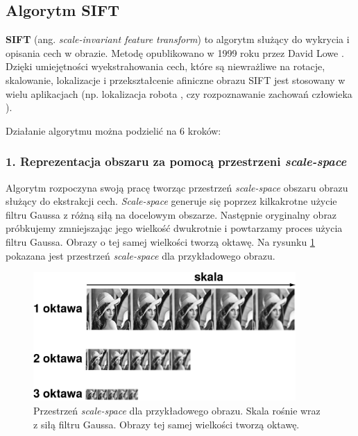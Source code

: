 \subsection{Algorytm SIFT}
\label{sec:proponowane_algorytmy:sift}

\textbf{SIFT} (ang. \textit{scale-invariant feature transform}) to algorytm służący do wykrycia i opisania cech w obrazie. Metodę opublikowano w 1999 roku przez David Lowe \cite{Lowe:2004:DIF:993451.996342}. Dzięki umiejętności wyekstrahowania cech, które są niewrażliwe na rotacje, skalowanie, lokalizacje i przekształcenie afiniczne obrazu SIFT jest stosowany w wielu aplikacjach (np. lokalizacja robota \cite{conf/icra/2001}, czy rozpoznawanie zachowań człowieka \cite{Laptev:2007:LVM:1314710.1314906}).

Działanie algorytmu można podzielić na 6 kroków:

\subsubsection{1. Reprezentacja obszaru za pomocą przestrzeni \textit{scale-space}}
\label{sec:proponowane_algorytmy:scale_space}

Algorytm rozpoczyna swoją pracę tworząc przestrzeń \textit{scale-space} obszaru obrazu służący do ekstrakcji cech. \textit{Scale-space} generuje się poprzez kilkakrotne użycie filtru Gaussa z różną siłą na docelowym obszarze. Następnie oryginalny obraz próbkujemy zmniejszając jego wielkość dwukrotnie i powtarzamy proces użycia filtru Gaussa. Obrazy o tej samej wielkości tworzą oktawę. Na rysunku \ref{fig:proponowane_algorytmy:scale_space_fig} pokazana jest przestrzeń \textit{scale-space} dla przykładowego obrazu.

\begin{figure}[H]
  \centering
  \includegraphics[width=10cm]{gfx/scale_space}
  \caption{Przestrzeń \textit{scale-space} dla przykładowego obrazu. Skala rośnie wraz z siłą filtru Gaussa. Obrazy tej samej wielkości tworzą oktawę.}
  \label{fig:proponowane_algorytmy:scale_space_fig}
\end{figure}


